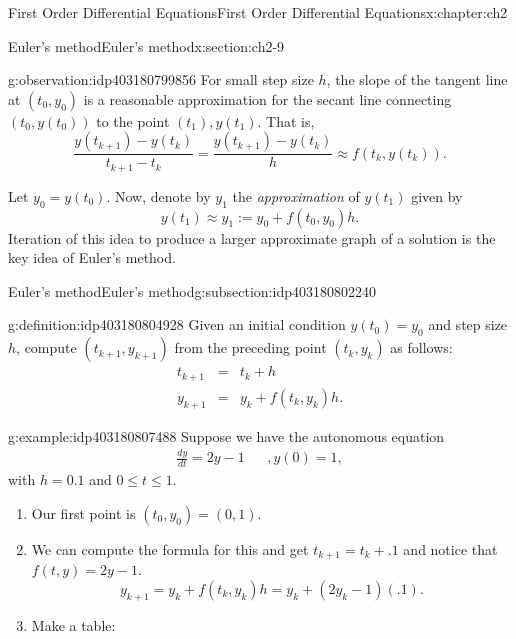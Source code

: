 \documentclass[oneside,10pt,]{book}
\numberwithin{equation}{section}
\numberwithin{equation}{section}
\newcommand{\amp}{&}
\begin{document}
\begin{chapterptx}{First Order Differential Equations}{}{First Order Differential Equations}{}{}{x:chapter:ch2}
\begin{sectionptx}{Euler's method}{}{Euler's method}{}{}{x:section:ch2-9}
\begin{introduction}{}
\begin{observation}{}{g:observation:idp403180799856}
For small step size \(h\), the slope of the tangent line at \((t_0, y_0)\) is a reasonable approximation for the secant line connecting \((t_0, y(t_0))\) to the point \((t_1), y(t_1)\). That is,%
\begin{equation*}
\frac{y(t_{k+1}) - y(t_k)}{t_{k+1} - t_k} = \frac{y(t_{k+1}) - y(t_k)}{h} \approx f(t_k, y(t_k)).
\end{equation*}
\end{observation}
Let \(y_0 = y(t_0)\). Now, denote by \(y_1\) the \emph{approximation} of \(y(t_1)\) given by%
\begin{equation*}
y(t_1) \approx y_1 := y_0 + f(t_0, y_0) h.
\end{equation*}
Iteration of this idea to produce a larger approximate graph of a solution is the key idea of Euler's method.%
\end{introduction}%
%
%
\typeout{************************************************}
\typeout{************************************************}
%
\begin{subsectionptx}{Euler's method}{}{Euler's method}{}{}{g:subsection:idp403180802240}
\begin{definition}{}{g:definition:idp403180804928}%
Given an initial condition \(y(t_{0})=y_{0}\) and step size \(h\), compute \(\left(t_{k+1},y_{k+1}\right)\) from the preceding point \((t_{k},y_{k})\) as follows:%
\begin{align*}
t_{k+1} \amp = \amp t_{k}+h\\
y_{k+1} \amp = \amp y_{k}+f\left(t_{k},y_{k}\right)h.
\end{align*}
%
\end{definition}
\begin{example}{}{g:example:idp403180807488}%
Suppose we have the autonomous equation%
\begin{align*}
\frac{dy}{dt}=2y-1 \amp  \amp ,y(0)=1,
\end{align*}
with \(h=0.1\) and \(0\leq t\leq1\).%
%
\begin{enumerate}
\item{}Our first point is \((t_{0},y_{0})=\left(0,1\right)\).%
\item{}We can compute the formula for this and get \(t_{k+1}=t_{k}+.1\) and notice that \(f\left(t,y\right)=2y-1\).%
\begin{equation*}
y_{k+1}=y_{k}+f\left(t_{k},y_{k}\right)h=y_{k}+\left(2y_{k}-1\right)(.1).
\end{equation*}
%
\item{}Make a table:%

\end{enumerate}
\end{example}
\end{subsectionptx}
\end{sectionptx}
\end{chapterptx}
\end{document}
